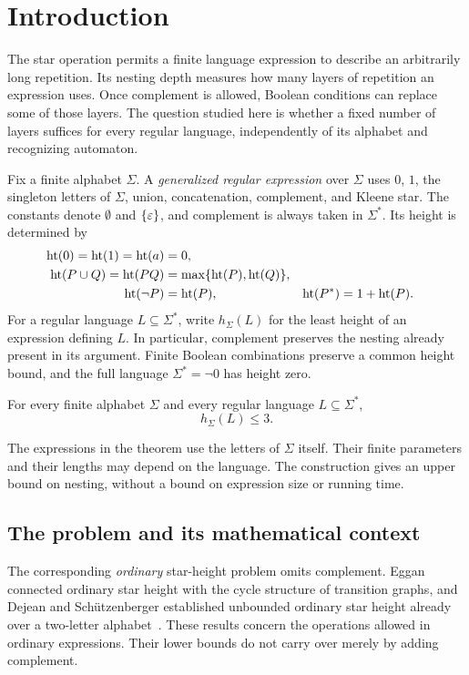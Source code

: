 \section{Introduction}\label{sec:introduction}

The star operation permits a finite language expression to describe an
arbitrarily long repetition. Its nesting depth measures how many layers
of repetition an expression uses. Once complement is allowed, Boolean
conditions can replace some of those layers. The question studied here
is whether a fixed number of layers suffices for every regular language,
independently of its alphabet and recognizing automaton.

Fix a finite alphabet $\Sigma$. A \emph{generalized regular expression}
over $\Sigma$ uses $0$, $1$, the singleton letters of $\Sigma$, union,
concatenation, complement, and Kleene star. The constants denote
$\emptyset$ and $\{\varepsilon\}$, and complement is always taken in $\Sigma^*$.
Its height is determined by
\[
\begin{aligned}
 \operatorname{ht}(0)=\operatorname{ht}(1)=\operatorname{ht}(a)&=0,\\
 \operatorname{ht}(P\cup Q)=\operatorname{ht}(PQ)&=\max\{\operatorname{ht}(P),\operatorname{ht}(Q)\},\\
 \operatorname{ht}(\neg P)&=\operatorname{ht}(P),&
 \operatorname{ht}(P^*)&=1+\operatorname{ht}(P).
\end{aligned}
\]
For a regular language $L\subseteq\Sigma^*$, write $h_\Sigma(L)$ for
the least height of an expression defining $L$. In particular,
complement preserves the nesting already present in its argument. Finite
Boolean combinations preserve a common height bound, and the full
language $\Sigma^*=\neg0$ has height zero.

\begin{theorem}\label{thm:main}
For every finite alphabet $\Sigma$ and every regular language
$L\subseteq\Sigma^*$,
\[
                            h_\Sigma(L)\le3.
\]
\end{theorem}

The expressions in the theorem use the letters of $\Sigma$ itself. Their
finite parameters and their lengths may depend on the language. The
construction gives an upper bound on nesting, without a bound on
expression size or running time.

\subsection{The problem and its mathematical context}

The corresponding \emph{ordinary} star-height problem omits complement.
Eggan connected ordinary star height with the cycle structure of
transition graphs, and Dejean and Sch\"utzenberger established unbounded
ordinary star height already over a two-letter
alphabet~\cite{Eggan1963,DejeanSchutzenberger1966}. These results concern
the operations allowed in ordinary expressions. Their lower bounds do
not carry over merely by adding complement.


